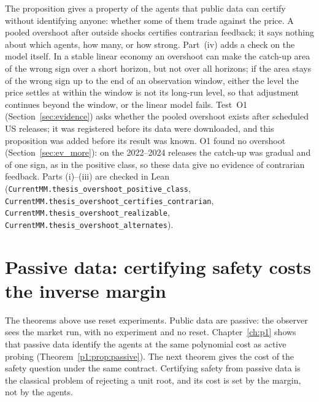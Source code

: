 The proposition gives a property of the agents that public data can certify without identifying anyone: whether some of them trade against the price. A pooled overshoot after outside shocks certifies contrarian feedback; it says nothing about which agents, how many, or how strong. Part~(iv) adds a check on the model itself. In a stable linear economy an overshoot can make the catch-up area of the wrong sign over a short horizon, but not over all horizons; if the area stays of the wrong sign up to the end of an observation window, either the level the price settles at within the window is not its long-run level, so that adjustment continues beyond the window, or the linear model fails. Test~O1 (Section~\ref{sec:evidence}) asks whether the pooled overshoot exists after scheduled US releases; it was registered before its data were downloaded, and this proposition was added before its result was known. O1 found no overshoot (Section~\ref{sec:ev_more}): on the 2022--2024 releases the catch-up was gradual and of one sign, as in the positive class, so these data give no evidence of contrarian feedback. Parts (i)--(iii) are checked in Lean (\nolinkurl{CurrentMM.thesis_overshoot_positive_class}, \nolinkurl{CurrentMM.thesis_overshoot_certifies_contrarian}, \nolinkurl{CurrentMM.thesis_overshoot_realizable}, \nolinkurl{CurrentMM.thesis_overshoot_alternates}).

\section{Passive data: certifying safety costs the inverse margin}\label{sec:passive}

The theorems above use reset experiments. Public data are passive: the observer sees the market run, with no experiment and no reset. Chapter~\ref{ch:p1} shows that passive data identify the agents at the same polynomial cost as active probing (Theorem~\ref{p1:prop:passive}). The next theorem gives the cost of the safety question under the same contract. Certifying safety from passive data is the classical problem of rejecting a unit root, and its cost is set by the margin, not by the agents.

